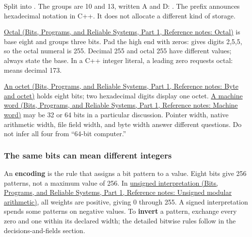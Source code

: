 Split  into . The groups are 10 and 13, written A and D: . The prefix  announces hexadecimal notation in C++. It does not allocate a different kind of storage.

\href{../01-Bits-Programs-and-Reliable-Systems-P01/main.pdf\#appendix-17fc1bc8b305}{Octal (Bits, Programs, and Reliable Systems, Part 1, Reference notes: Octal)} is base eight and groups three bits. Pad the high end with zeros:  gives digits 2,5,5, so the octal numeral is 255. Decimal 255 and octal 255 have different values; always state the base. In a C++ integer literal, a leading zero requests octal:  means decimal 173.

\href{../01-Bits-Programs-and-Reliable-Systems-P01/main.pdf\#appendix-5bee2df85484}{An octet (Bits, Programs, and Reliable Systems, Part 1, Reference notes: Byte and octet)} holds eight bits; two hexadecimal digits display one octet. \href{../01-Bits-Programs-and-Reliable-Systems-P01/main.pdf\#appendix-d67a19507dc5}{A machine word (Bits, Programs, and Reliable Systems, Part 1, Reference notes: Machine word)} may be 32 or 64 bits in a particular discussion. Pointer width, native arithmetic width, file field width, and byte width answer different questions. Do not infer all four from ``64-bit computer.''

\subsubsection{The same bits can mean different integers}\label{05-engine-i-ch001-the-same-bits-can-mean-different-integers}

\hypertarget{05-engine-i-ch001-the-same-bits-can-mean-different-integers}{}

An \textbf{encoding} is the rule that assigns a bit pattern to a value. Eight bits give 256 patterns, not a maximum value of 256. In \href{../01-Bits-Programs-and-Reliable-Systems-P01/main.pdf\#appendix-c99977d88b33}{unsigned interpretation (Bits, Programs, and Reliable Systems, Part 1, Reference notes: Unsigned modular arithmetic)}, all weights are positive, giving 0 through 255. A signed interpretation spends some patterns on negative values. To \textbf{invert} a pattern, exchange every zero and one within its declared width; the detailed bitwise rules follow in the decisions-and-fields section.

